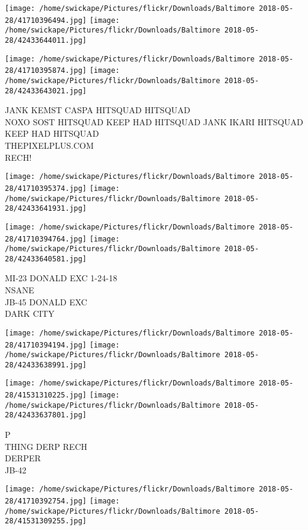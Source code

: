 \documentclass[10pt,letterpaper]{article}
\begin{document}
\texttt{[image: /home/swickape/Pictures/flickr/Downloads/Baltimore 2018-05-28/41710396494.jpg]}
\texttt{[image: /home/swickape/Pictures/flickr/Downloads/Baltimore 2018-05-28/42433644011.jpg]}

\texttt{[image: /home/swickape/Pictures/flickr/Downloads/Baltimore 2018-05-28/41710395874.jpg]}
\texttt{[image: /home/swickape/Pictures/flickr/Downloads/Baltimore 2018-05-28/42433643021.jpg]}

JANK KEMST CASPA HITSQUAD HITSQUAD\\
NOXO SOST HITSQUAD KEEP HAD HITSQUAD JANK IKARI HITSQUAD KEEP HAD HITSQUAD\\
THEPIXELPLUS.COM\\
RECH!
\pagebreak

\texttt{[image: /home/swickape/Pictures/flickr/Downloads/Baltimore 2018-05-28/41710395374.jpg]}
\texttt{[image: /home/swickape/Pictures/flickr/Downloads/Baltimore 2018-05-28/42433641931.jpg]}

\texttt{[image: /home/swickape/Pictures/flickr/Downloads/Baltimore 2018-05-28/41710394764.jpg]}
\texttt{[image: /home/swickape/Pictures/flickr/Downloads/Baltimore 2018-05-28/42433640581.jpg]}

MI{-}23 DONALD EXC 1{-}24{-}18\\
NSANE\\
JB{-}45 DONALD EXC\\
DARK CITY
\pagebreak

\texttt{[image: /home/swickape/Pictures/flickr/Downloads/Baltimore 2018-05-28/41710394194.jpg]}
\texttt{[image: /home/swickape/Pictures/flickr/Downloads/Baltimore 2018-05-28/42433638991.jpg]}

\texttt{[image: /home/swickape/Pictures/flickr/Downloads/Baltimore 2018-05-28/41531310225.jpg]}
\texttt{[image: /home/swickape/Pictures/flickr/Downloads/Baltimore 2018-05-28/42433637801.jpg]}

P\\
THING DERP RECH\\
DERPER\\
JB{-}42
\pagebreak

\texttt{[image: /home/swickape/Pictures/flickr/Downloads/Baltimore 2018-05-28/41710392754.jpg]}
\texttt{[image: /home/swickape/Pictures/flickr/Downloads/Baltimore 2018-05-28/41531309255.jpg]}
\end{document}
